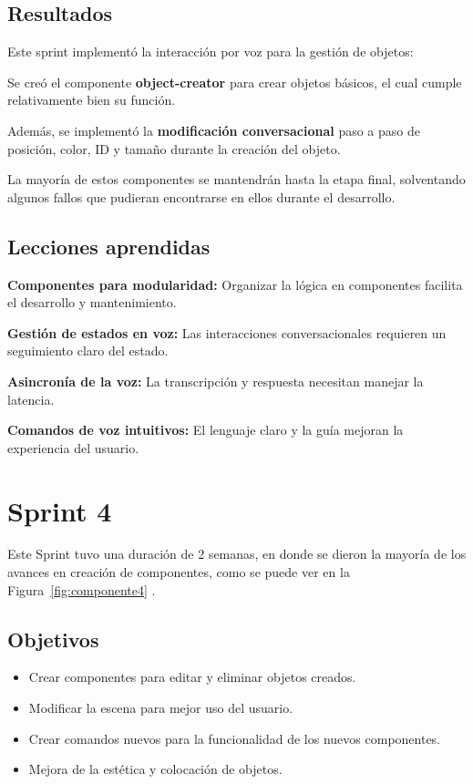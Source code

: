 \documentclass[a4paper, 12pt]{book}
\begin{document}
\subsection{Resultados}

Este sprint implementó la interacción por voz para la gestión de objetos:

Se creó el componente \textbf{object-creator} para crear objetos básicos, el cual cumple relativamente bien su función.

Además, se implementó la \textbf{modificación conversacional} paso a paso de posición, color, ID y tamaño durante la creación del objeto.

La mayoría de estos componentes se mantendrán hasta la etapa final, solventando algunos fallos que pudieran encontrarse en ellos durante el desarrollo.

\subsection{Lecciones aprendidas}
\textbf{Componentes para modularidad:} Organizar la lógica en componentes facilita el desarrollo y mantenimiento.

\textbf{Gestión de estados en voz:} Las interacciones conversacionales requieren un seguimiento claro del estado.

\textbf{Asincronía de la voz:} La transcripción y respuesta necesitan manejar la latencia.

\textbf{Comandos de voz intuitivos:} El lenguaje claro y la guía mejoran la experiencia del usuario.

 \clearpage
\section{Sprint 4} 
\label{sec:sprint4}
Este Sprint tuvo una duración de 2 semanas, en donde se dieron la mayoría de los avances en creación de componentes, como se puede ver en la Figura~\ref{fig:componente4} .
\subsection{Objetivos}
\begin{itemize}
\item Crear componentes para editar y eliminar objetos creados.
\item Modificar la escena para mejor uso del usuario.
\item Crear comandos nuevos para la funcionalidad de los nuevos componentes.
\item Mejora de la estética y colocación de objetos.
\end{itemize}
\end{document}
